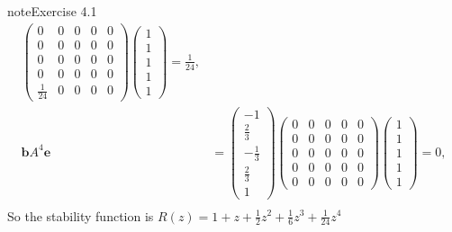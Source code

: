 \documentclass[letterpaper,10pt,english]{jupyterBook}
\begin{document}
\begin{sphinxadmonition}{note}{Exercise 4.1}
\begin{align*}
    \begin{pmatrix} 
        0 & 0 & 0 & 0 & 0 \\
        0 & 0 & 0 & 0 & 0 \\
        0 & 0 & 0 & 0 & 0 \\
        0 & 0 & 0 & 0 & 0 \\
        \frac{1}{24} & 0 & 0 & 0 & 0
    \end{pmatrix}
    \begin{pmatrix} 1 \\ 1 \\ 1 \\ 1 \\ 1 \end{pmatrix}
    = \frac{1}{24}, \\
    \mathbf{b} A^4 \mathbf{e} &= 
    \begin{pmatrix} -1 \\ \frac{2}{3} \\ -\frac{1}{3} \\ \frac{2}{3} \\ 1 \end{pmatrix}
    \begin{pmatrix} 
        0 & 0 & 0 & 0 & 0 \\
        0 & 0 & 0 & 0 & 0 \\
        0 & 0 & 0 & 0 & 0 \\
        0 & 0 & 0 & 0 & 0 \\
        0 & 0 & 0 & 0 & 0
    \end{pmatrix}
    \begin{pmatrix} 1 \\ 1 \\ 1 \\ 1 \\ 1 \end{pmatrix}
    = 0, \\
\end{align*}
\sphinxAtStartPar
So the stability function is \(R(z) = 1 + z + \frac{1}{2} z^2 + \frac{1}{6} z^3 + \frac{1}{24} z^4\)
\end{sphinxadmonition}
\end{document}
